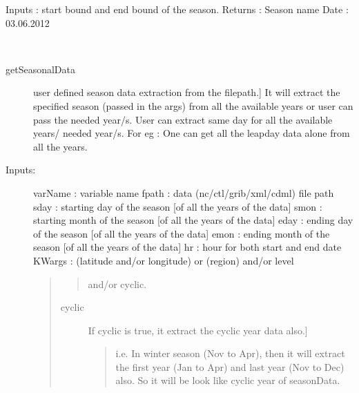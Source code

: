 \documentclass[letterpaper,10pt,english]{sphinxmanual}
\begin{document}
\begin{fulllineitems}
\begin{fulllineitems}
\label{diagnosisutils:xml_data_access.TimeUtility.getSeasonName}
Inputs : start bound and end bound of the season.
Returns : Season name
Date : 03.06.2012

\end{fulllineitems}


\begin{fulllineitems}
\label{diagnosisutils:xml_data_access.TimeUtility.getSeasonalData}~\begin{description}
\item[{getSeasonalData}] \leavevmode{[}user defined season data extraction from the filepath.{]}
It will extract the specified season (passed in the args)
from all the available years or user can pass the needed
year/s.
User can extract same day for all the available years/
needed year/s. For eg : One can get all the leapday data
alone from all the years.

\item[{Inputs:}] \leavevmode
varName : variable name
fpath : data (nc/ctl/grib/xml/cdml) file path
sday : starting day of the season {[}of all the years of the data{]}
smon : starting month of the season {[}of all the years of the data{]}
eday : ending day of the season {[}of all the years of the data{]}
emon : ending month of the season {[}of all the years of the data{]}
hr : hour for both start and end date
KWargs : (latitude and/or longitude) or (region) and/or level
\begin{quote}
\begin{quote}

and/or cyclic.
\end{quote}
\begin{description}
\item[{cyclic}] \leavevmode{[}If cyclic is true, it extract the cyclic year data also.{]}\begin{quote}

i.e. In winter season (Nov to Apr), then it will extract the
first year (Jan to Apr) and last year (Nov to Dec) also.
So it will be look like cyclic year of seasonData.
\begin{quote}


\end{quote}
\end{quote}
\end{description}
\end{quote}
\end{description}
\end{fulllineitems}
\end{fulllineitems}
\end{document}
